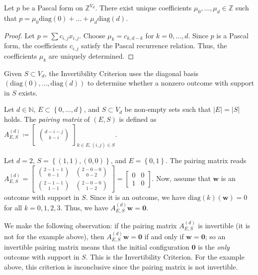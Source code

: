 \begin{proposition}
    Let \( p \) be a Pascal form on \( \mathbb Z^{V_d} \). There exist unique coefficients \( \mu_0, \dots, \mu_d \in \mathbb{Z} \) such that 
    \( p = \mu_0 \mathrm{diag}(0) + \dots + \mu_d \mathrm{diag}(d) \).
\end{proposition}

\begin{proof}
    Let \( p = \sum c_{i,j}x_{i,j} \). Choose \( \mu_k = c_{k,d-k} \) for \( k=0, \dots, d \). Since \( p \) is a Pascal form, the coefficients \( c_{i,j} \) satisfy the Pascal recurrence relation. Thus, the coefficients \( \mu_k \) are uniquely determined.
\end{proof}

Given \( S \subset V_d \), the Invertibility Criterion uses the diagonal basis \( (\mathrm{diag}(0), \dots, \mathrm{diag}(d)) \) to determine whether a nonzero outcome with support in \( S \) exists.

\begin{definition}\label{def:pairing-matrix}
    Let \( d \in \mathbb{N} \), \( E \subset \left\{ 0, \dots, d \right\} \), and \( S \subset V_d \) be non-empty sets such that \( \lvert E \rvert = \lvert S \rvert \) holds. The \emph{pairing matrix} of \( (E,S) \) is defined as \( A^{(d)}_{E,S} \coloneqq \begin{bmatrix} \binom{d-i-j}{k-i} \end{bmatrix}_{k \in E, (i,j) \in S} \).
\end{definition}

\begin{example}
    Let \( d = 2 \), \( S = \left\{ (1,1), (0,0) \right\} \), and \( E = \left\{ 0,1 \right\} \). The pairing matrix reads \(  A^{(d)}_{E,S}  = \begin{bmatrix}
        \binom{2-1-1}{0-1} & \binom{2-0-0}{0-2} \\
        \binom{2-1-1}{1-1}  & \binom{2-0-0}{1-2}
    \end{bmatrix} = \begin{bmatrix}
        0 & 0 \\
        1 & 0
    \end{bmatrix} \). Now, assume that \( \mathbf{w} \) is an outcome with support in \( S \). Since it is an outcome, we have \( \mathrm{diag}(k)(\mathbf{w}) = 0 \) for all \( k = 0, 1,2,3 \). Thus, we have \(  A^{(d)}_{E,S} \mathbf w = \mathbf 0 \).
\end{example}

We make the following observation: if the pairing matrix \( A^{(d)}_{E,S} \) is invertible (it is not for the example above), then \( A^{(d)}_{E,S} \mathbf w = \mathbf 0 \) if and only if \( \mathbf w = \mathbf 0 \); so an invertible pairing matrix means that the initial configuration \( \mathbf{0} \) is the \emph{only} outcome with support in \( S \). This is the Invertibility Criterion. For the example above, this criterion is inconclusive since the pairing matrix is not invertible.

